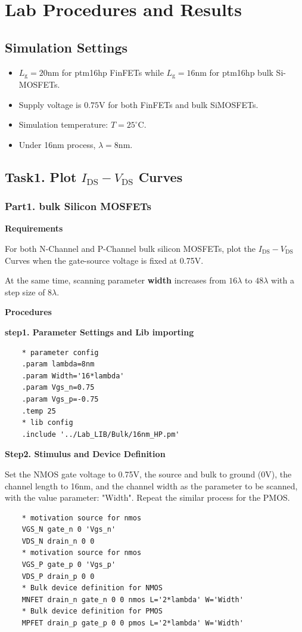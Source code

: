 \documentclass[UTF8,12pt,a4paper]{article}
\begin{document}
\newpage
\section{Lab Procedures and Results}

\subsection{Simulation Settings}
\begin{itemize}
	\item $L_{\text{g}} = 20\text{nm}$ for ptm16hp FinFETs while $L_{\text{g}} = 16\text{nm}$ for ptm16hp bulk Si-MOSFETs.
	\item Supply voltage is $0.75\text{V}$ for both FinFETs and bulk SiMOSFETs.
	\item Simulation temperature: $T = 25^\circ$C.
	\item Under 16nm process, $\lambda=8\text{nm}$.
\end{itemize}
\subsection{Task1. Plot $I_{\text{DS}}-V_{\text{DS}}$ Curves}

\subsubsection{Part1. bulk Silicon MOSFETs}
\textbf{Requirements}

For both N-Channel and P-Channel bulk silicon MOSFETs, plot the $I_{\text{DS}}-V_{\text{DS}}$ Curves when the gate-source voltage is fixed at 0.75V. 

At the same time, scanning parameter \textbf{width} increases from $16\lambda$ to $48\lambda$ with a step size of $8\lambda$.

\textbf{Procedures}

\textbf{step1. Parameter Settings and Lib importing}
\begin{lstlisting}
	* parameter config
	.param lambda=8nm
	.param Width='16*lambda'
	.param Vgs_n=0.75
	.param Vgs_p=-0.75
	.temp 25
	* lib config
	.include '../Lab_LIB/Bulk/16nm_HP.pm'
\end{lstlisting}

\textbf{Step2. Stimulus and Device Definition}

Set the NMOS gate voltage to 0.75V, the source and bulk to ground (0V), the channel length to 16nm, and the channel width as the parameter to be scanned, with the value parameter: "Width". Repeat the similar process for the PMOS.
\begin{lstlisting}
	* motivation source for nmos
	VGS_N gate_n 0 'Vgs_n'
	VDS_N drain_n 0 0
	* motivation source for nmos
	VGS_P gate_p 0 'Vgs_p'
	VDS_P drain_p 0 0
	* Bulk device definition for NMOS
	MNFET drain_n gate_n 0 0 nmos L='2*lambda' W='Width'
	* Bulk device definition for PMOS
	MPFET drain_p gate_p 0 0 pmos L='2*lambda' W='Width'
\end{lstlisting}
\end{document}
